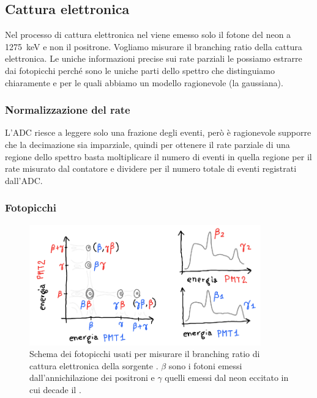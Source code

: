 \subsection{Cattura elettronica}
\label{sec:cattura}

Nel processo di cattura elettronica nel \na{}
viene emesso solo il fotone del neon a \SI{1275}{keV} e non il positrone.
Vogliamo misurare il branching ratio della cattura elettronica.
Le uniche informazioni precise sui rate parziali le possiamo estrarre dai fotopicchi
perché sono le uniche parti dello spettro che distinguiamo chiaramente
e per le quali abbiamo un modello ragionevole (la gaussiana).

\subsubsection{Normalizzazione del rate}

L'ADC riesce a leggere solo una frazione degli eventi,
però è ragionevole supporre che la decimazione sia imparziale,
quindi per ottenere il rate parziale di una regione dello spettro
basta moltiplicare il numero di eventi in quella regione
per il rate misurato dal contatore
e dividere per il numero totale di eventi registrati dall'ADC.

\subsubsection{Fotopicchi}

\begin{figure}
	\centering
	\includegraphics[width=27em]{immagini/schemapicchi}
	\caption{\label{fig:schemapicchi}
	Schema dei fotopicchi usati per misurare il branching ratio di cattura elettronica della sorgente \na{}.
	$\beta$ sono i fotoni emessi dall'annichilazione dei positroni
	e $\gamma$ quelli emessi dal neon eccitato in cui decade il \na.}
\end{figure}

